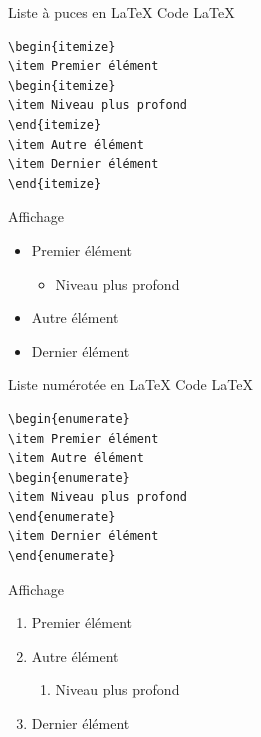 \documentclass[presentation,t]{beamer}
\begin{document}
\begin{frame}[fragile,label={sec:orgf08eb17}]{Liste \og à puces\fg{} en \LaTeX{}}
 Code \LaTeX{}

\lstset{language=[LaTeX]TeX,label= ,caption= ,captionpos=b,numbers=none}
\begin{lstlisting}
\begin{itemize}
\item Premier élément
\begin{itemize}
\item Niveau plus profond
\end{itemize}
\item Autre élément
\item Dernier élément
\end{itemize}
\end{lstlisting}

\pause{}

Affichage

\begin{mdframed}
\begin{itemize}
\item Premier élément
\begin{itemize}
\item Niveau plus profond
\end{itemize}
\item Autre élément
\item Dernier élément
\end{itemize}

\end{mdframed}
\end{frame}

\begin{frame}[fragile,label={sec:org4e0b0ff}]{Liste numérotée en \LaTeX{}}
 Code \LaTeX{}

\lstset{language=[LaTeX]TeX,label= ,caption= ,captionpos=b,numbers=none}
\begin{lstlisting}
\begin{enumerate}
\item Premier élément
\item Autre élément
\begin{enumerate}
\item Niveau plus profond
\end{enumerate}
\item Dernier élément
\end{enumerate}
\end{lstlisting}

\pause{}

Affichage

\begin{mdframed}
\begin{enumerate}
\item Premier élément
\item Autre élément
\begin{enumerate}
\item Niveau plus profond
\end{enumerate}
\item Dernier élément
\end{enumerate}

\end{mdframed}
\end{frame}
\end{document}
